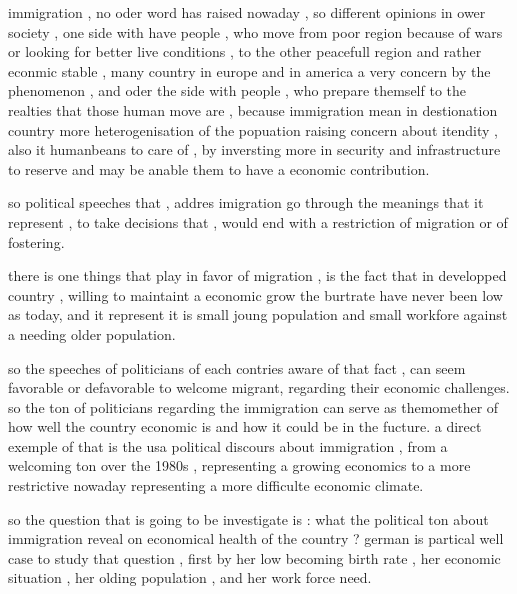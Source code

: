 \documentclass[12pt]{scrartcl}
\numberwithin{equation}{section}				%
\begin{document}
    
    immigration , no oder word has raised  nowaday , so different opinions in ower society , one side with have people , who move from poor region because of wars or looking for better live conditions , to the other peacefull region and rather econmic stable , many country in europe and in america a very concern by the phenomenon  , and oder the side with people , who prepare themself to the realties that those  human move are , because immigration mean in destionation country more heterogenisation of the popuation raising concern about itendity , also it humanbeans to care of , by inversting more in security and infrastructure to reserve and may be anable them to have a economic contribution.
    
    so political speeches that , addres imigration go through the meanings that it represent , to take decisions that , would end with a restriction of migration or of fostering.
    
    there is one things that play in favor of migration , is the fact that in developped country , willing to maintaint a economic grow the burtrate have never been low as today, and it represent it is small joung population and small workfore against a needing older population. 
    
    so the speeches of politicians of each contries aware of that fact , can seem favorable or defavorable to welcome migrant, regarding their economic challenges. so the ton of politicians   regarding the immigration can serve as themomether of how well the country economic is and how it could be in the fucture. a direct exemple of that is the usa political discours about immigration , from a welcoming ton over the 1980s , representing a growing economics to a more restrictive nowaday representing a more difficulte economic climate.
    
    so the question that is going to be investigate is : what the political ton about immigration reveal on economical health of the country ?  german is partical well case to study that question , first by her low becoming birth rate , her economic situation , her olding population , and her work force need. 
    
\end{document}
